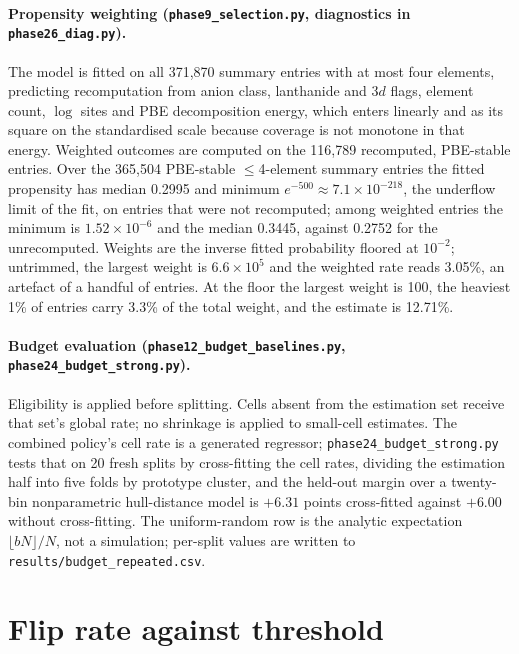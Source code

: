 \documentclass[11pt]{article}
\begin{document}
\paragraph{Propensity weighting (\texttt{phase9\_selection.py}, diagnostics in
\texttt{phase26\_diag.py}).} The model is fitted on all 371{,}870 summary entries with at
most four elements, predicting recomputation from anion class, lanthanide and 3$d$
flags, element count, $\log$ sites and PBE decomposition energy, which enters linearly
and as its square on the standardised scale because coverage is not monotone in that
energy. Weighted outcomes are computed on the 116{,}789 recomputed, PBE-stable entries.
Over the 365{,}504 PBE-stable $\le$4-element summary entries the fitted propensity has
median 0.2995 and minimum
$e^{-500} \approx 7.1\times10^{-218}$, the underflow limit of the fit, on entries that were not recomputed; among weighted entries the
minimum is $1.52\times10^{-6}$ and the median 0.3445, against 0.2752 for the
unrecomputed. Weights are the inverse fitted probability floored at $10^{-2}$; untrimmed,
the largest weight is $6.6\times10^{5}$ and the weighted rate reads 3.05\%, an artefact
of a handful of entries. At the floor the largest weight is 100, the heaviest 1\% of
entries carry 3.3\% of the total weight, and the estimate is 12.71\%.

\paragraph{Budget evaluation (\texttt{phase12\_budget\_baselines.py},
\texttt{phase24\_budget\_strong.py}).} Eligibility is applied before splitting. Cells
absent from the estimation set receive that set's global rate; no shrinkage is applied
to small-cell estimates. The combined policy's cell rate is a generated regressor;
\texttt{phase24\_budget\_strong.py} tests that on 20 fresh splits by cross-fitting the
cell rates, dividing the estimation half into five folds by prototype cluster, and the
held-out margin over a twenty-bin nonparametric hull-distance model is $+6.31$ points
cross-fitted against $+6.00$ without cross-fitting. The uniform-random row is the analytic expectation
$\lfloor bN \rfloor / N$, not a simulation; per-split values are written to
\texttt{results/budget\_repeated.csv}.

\section{Flip rate against threshold}\label{app:threshold}
\end{document}
